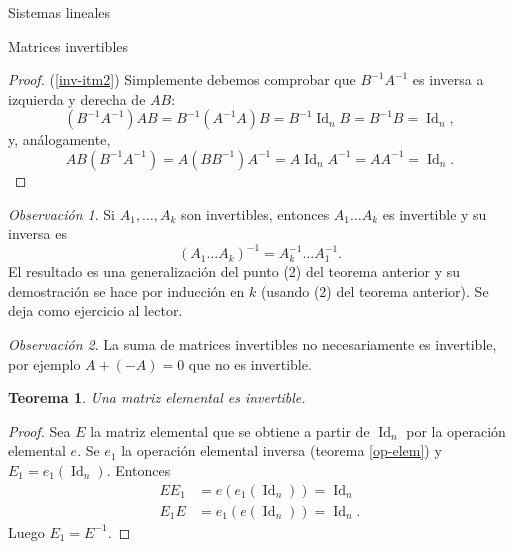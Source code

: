 \documentclass[a4paper,12pt,twoside,spanish,reqno]{amsbook}
\newtheorem{teorema}{Teorema}[section]
\theoremstyle{definition}
\theoremstyle{remark}
\newtheorem{observacion}{Observaci\'on}[section]
\newcommand{\Id}{\operatorname{Id}}
\begin{document}
\begin{chapter}{Sistemas lineales}
\begin{section}{Matrices invertibles}
\begin{proof}
                    (\ref{inv-itm2}) Simplemente debemos comprobar que $B^{-1}A^{-1}$ es inversa a izquierda y derecha de $AB$:
                    \begin{equation*}
                    (B^{-1}A^{-1})AB = B^{-1}(A^{-1}A)B = B^{-1}\Id_nB =B^{-1}B = \Id_n,
                    \end{equation*}
                    y,  análogamente,
                    \begin{equation*}
                    AB(B^{-1}A^{-1}) = A(BB^{-1})A^{-1} = A\Id_nA^{-1} =AA^{-1} = \Id_n.
                    \end{equation*} 
                \end{proof}
            
            
            \begin{observacion}
                Si $A_1,\ldots,A_k$  son invertibles,  entonces $A_1\ldots A_k$ es invertible y su inversa es  $$(A_1\ldots A_k)^{-1} = A_k^{-1}\ldots A_1^{-1} .$$
                El resultado es una generalización del punto (2) del teorema anterior y su demostración se hace por inducción en $k$ (usando (2)  del teorema anterior). Se deja como ejercicio al lector. 
            \end{observacion}
            
            \begin{observacion}
                La suma de matrices invertibles no necesariamente es invertible, por ejemplo $A+ (-A)= 0$ que no es invertible. 
            \end{observacion}	
            
            
            \begin{teorema}\label{th-elmental-impl-invertible}
                Una matriz elemental es invertible.
            \end{teorema}
            \begin{proof}
                Sea $E$ la matriz elemental que se obtiene a partir de $\Id_n$ por la operación elemental $e$. Se $e_1$ la operación elemental inversa (teorema \ref{op-elem}) y $E_1 = e_1(\Id_n)$. Entonces 
                \begin{align*}
                EE_1 &= e(e_1(\Id_n)) = \Id_n \\
                E_1E &= e_1(e(\Id_n)) = \Id_n.
                \end{align*}
                Luego  $E_1 = E^{-1}$. 
            \end{proof}	
            

\end{section}
\end{chapter}
\end{document}
